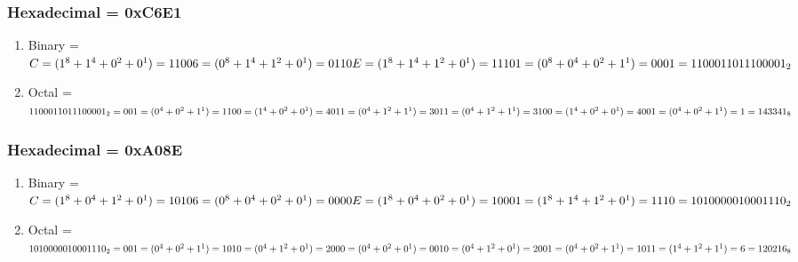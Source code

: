 \documentclass[12pt]{article}
\begin{document}
\subsubsection{Hexadecimal = 0xC6E1}
\begin{enumerate}[label=(\Alph*)]
	\item Binary = $\\
		{C = (1^8 + 1^4 + 0^2 + 0^1) = 1100} \\
		{6 = (0^8 + 1^4 + 1^2 + 0^1) = 0110} \\
		{E = (1^8 + 1^4 + 1^2 + 0^1) = 1110} \\
		{1 = (0^8 + 0^4 + 0^2 + 1^1) = 0001}\\
		= 1100011011100001_2 $
\item Octal = $\\
1100 0110 1110 0001_2 =\\
		{ 001 = (0^4 + 0^2 + 1^1)= 1}\\
		{ 100 = (1^4 + 0^2 + 0^1)= 4}\\
		{ 011 = (0^4 + 1^2 + 1^1)= 3}\\
		{ 011 = (0^4 + 1^2 + 1^1)= 3}\\
		{ 100 = (1^4 + 0^2 + 0^1)= 4}\\
		{ 001 = (0^4 + 0^2 + 1^1)= 1}\\
		= 143341_8
	$
\end{enumerate}
\subsubsection{Hexadecimal = 0xA08E}
\begin{enumerate}[label=(\Alph*)]
	\item Binary = $\\
		{C = (1^8 + 0^4 + 1^2 + 0^1) = 1010} \\
		{6 = (0^8 + 0^4 + 0^2 + 0^1) = 0000} \\
		{E = (1^8 + 0^4 + 0^2 + 0^1) = 1000} \\
		{1 = (1^8 + 1^4 + 1^2 + 0^1) = 1110}\\
		=  1010000010001110_2$

\item Octal = $\\
1010 0000 1000 1110_2 =\\
{001 = (0^4 + 0^2 + 1^1) = 1}\\
{010 = (0^4 + 1^2 + 0^1) = 2}\\
{000 = (0^4 + 0^2 + 0^1) = 0}\\
{010 = (0^4 + 1^2 + 0^1) = 2}\\
{001 = (0^4 + 0^2 + 1^1) = 1}\\
{011 = (1^4 + 1^2 + 1^1) = 6}\\
= 120216_8 $

\end{enumerate}
\end{document}
